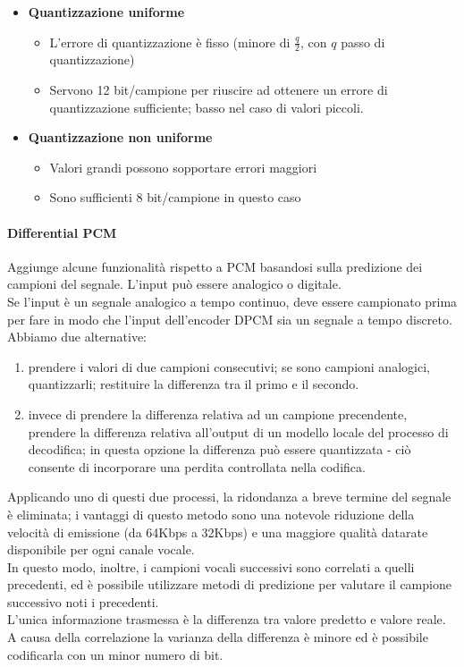 \begin{itemize}
	\item \textbf{Quantizzazione uniforme}	
	\begin{itemize}
		\item L'errore di quantizzazione è fisso (minore di $ \frac{q}{2} $, con $ q $ passo di quantizzazione)
		\item Servono 12 bit/campione per riuscire ad ottenere un errore di quantizzazione sufficiente; basso nel caso di valori piccoli.
	\end{itemize}
	\item \textbf{Quantizzazione non uniforme}
	\begin{itemize}
		\item Valori grandi possono sopportare errori maggiori
		\item Sono sufficienti 8 bit/campione in questo caso
	\end{itemize}
\end{itemize}

\paragraph{Differential PCM}
Aggiunge alcune funzionalità rispetto a PCM basandosi sulla predizione dei campioni del segnale. L'input può essere analogico o digitale.\\
Se l'input è un segnale analogico a tempo continuo, deve essere campionato prima per fare in modo che l'input dell'encoder DPCM sia un segnale a tempo discreto.\\
Abbiamo due alternative:
\begin{enumerate}
	\item prendere i valori di due campioni consecutivi; se sono campioni analogici, quantizzarli; restituire la differenza tra il primo e il secondo.
	\item invece di prendere la differenza relativa ad un campione precendente, prendere la differenza relativa all'output di un modello locale del processo di decodifica; in questa opzione la differenza può essere quantizzata - ciò consente di incorporare una perdita controllata nella codifica.
\end{enumerate}
Applicando uno di questi due processi, la ridondanza a breve termine del segnale è eliminata; i vantaggi di questo metodo sono una notevole riduzione della velocità di emissione (da 64Kbps a 32Kbps) e  una maggiore qualità datarate disponibile per ogni canale vocale.\\
In questo modo, inoltre, i campioni vocali successivi sono correlati a quelli precedenti, ed è possibile utilizzare metodi di predizione per valutare il campione successivo noti i precedenti.\\
L'unica informazione trasmessa è la differenza tra valore predetto e valore reale. A causa della correlazione la varianza della differenza è minore ed è possibile codificarla con un minor numero di bit.\\

